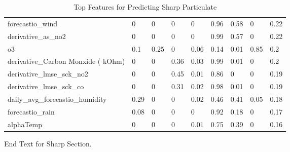 \begin{table}[H]
\begin{tabular}{lllllllll}
forecastio\_wind                             & 0     & 0          & 0    & 0    & 0.96  & 0.58      & 0    & 0.22 \\
derivative\_as\_no2                          & 0     & 0          & 0    & 0    & 0.99  & 0.57      & 0    & 0.22 \\
o3                                           & 0.1   & 0.25       & 0    & 0.06 & 0.14  & 0.01      & 0.85 & 0.2  \\
derivative\_Carbon Monxide ( kOhm)           & 0     & 0          & 0.36 & 0.03 & 0.99  & 0.01      & 0    & 0.2  \\
derivative\_lmse\_sck\_no2                   & 0     & 0          & 0.45 & 0.01 & 0.86  & 0         & 0    & 0.19 \\
derivative\_lmse\_sck\_co                    & 0     & 0          & 0.31 & 0.02 & 0.98  & 0.01      & 0    & 0.19 \\
daily\_avg\_forecastio\_humidity             & 0.29  & 0          & 0    & 0.02 & 0.46  & 0.41      & 0.05 & 0.18 \\
forecastio\_rain                             & 0.08  & 0          & 0    & 0    & 0.92  & 0.18      & 0    & 0.17 \\
alphaTemp                                    & 0     & 0          & 0    & 0.01 & 0.75  & 0.39      & 0    & 0.16 \\
\bottomrule
\end{tabular}
\label{tab:sharp_top_features}
\caption{Top Features for Predicting Sharp Particulate}
\end{table}

End Text for Sharp Section.
